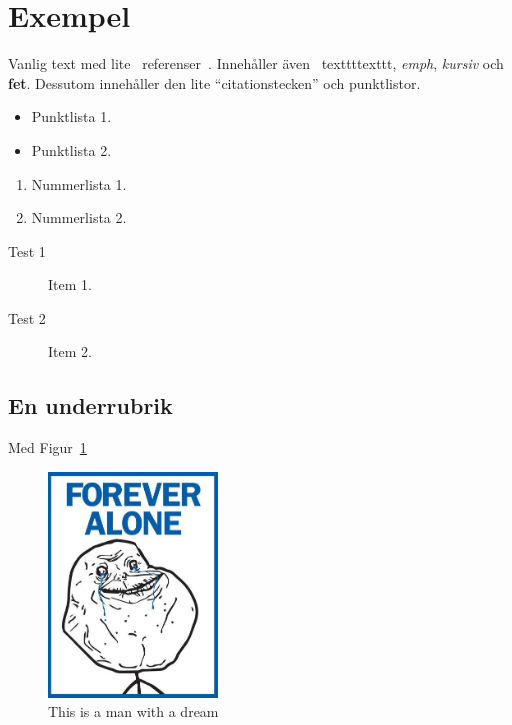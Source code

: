 \documentclass[conference,a4paper]{IEEEtran}
\begin{document}
\section{Exempel}
Vanlig text med lite~\cite{biggs84} referenser~\cite{web:pox}. Innehåller även \
texttt{texttt}, \emph{emph}, \textit{kursiv} och \textbf{fet}. Dessutom innehåller
den lite ``citationstecken'' och punktlistor.

\begin{itemize}
\item Punktlista 1.
\item Punktlista 2.
\end{itemize}
\begin{enumerate}
\item Nummerlista 1.
\item Nummerlista 2.
\end{enumerate}
\begin{description}
\item[Test 1] Item 1.
\item[Test 2] Item 2.
\end{description}
\subsection{En underrubrik}
Med Figur~\ref{fig1}
\begin{figure}
\center
\includegraphics[width=0.4\textwidth]{forver_alone.jpg}
\caption{This is a man with a dream}
\label{fig1}
\end{figure}
\printbibliography
\end{document}
